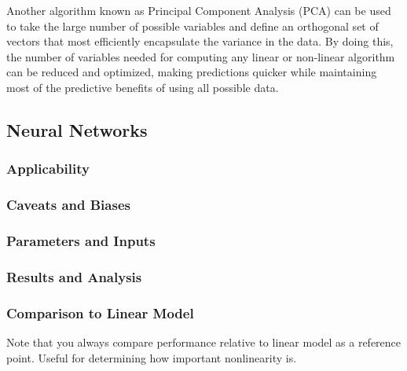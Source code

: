 Another algorithm known as Principal Component Analysis (PCA) can be used to take the large number of possible variables and define an orthogonal set of vectors that most efficiently encapsulate the variance in the data. By doing this, the number of variables needed for computing any linear or non-linear algorithm can be reduced and optimized, making predictions quicker while maintaining most of the predictive benefits of using all possible data.

\subsection{Neural Networks}

\subsubsection{Applicability}

\subsubsection{Caveats and Biases}

\subsubsection{Parameters and Inputs}

\subsubsection{Results and Analysis}

\subsubsection{Comparison to Linear Model}

\note Note that you always compare performance relative to linear model as a reference point.  Useful for determining how important nonlinearity is.

